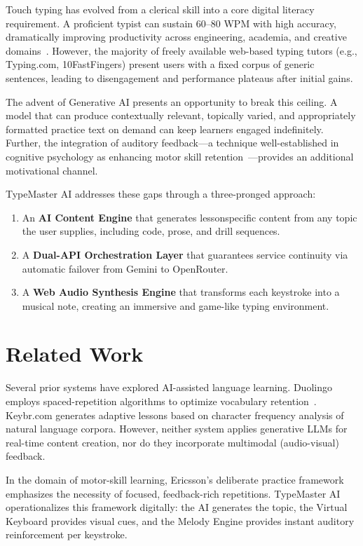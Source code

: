 \documentclass[conference]{IEEEtran}
\begin{document}
Touch typing has evolved from a clerical skill into a core digital
literacy requirement. A proficient typist can sustain 60--80 WPM
with high accuracy, dramatically improving productivity across
engineering, academia, and creative domains~\cite{brown2012}.
However, the majority of freely available web-based typing tutors
(e.g., Typing.com, 10FastFingers) present users with a fixed corpus
of generic sentences, leading to disengagement and performance
plateaus after initial gains.

The advent of Generative AI presents an opportunity to break this
ceiling. A model that can produce contextually relevant, topically
varied, and appropriately formatted practice text on demand can keep
learners engaged indefinitely. Further, the integration of auditory
feedback---a technique well-established in cognitive psychology as
enhancing motor skill retention~\cite{mayer2014}---provides an
additional motivational channel.

TypeMaster AI addresses these gaps through a three-pronged approach:
\begin{enumerate}
  \item An \textbf{AI Content Engine} that generates lessonspecific
        content from any topic the user supplies, including code,
        prose, and drill sequences.
  \item A \textbf{Dual-API Orchestration Layer} that guarantees
        service continuity via automatic failover from Gemini to OpenRouter.
  \item A \textbf{Web Audio Synthesis Engine} that transforms each
        keystroke into a musical note, creating an immersive and
        game-like typing environment.
\end{enumerate}

\section{Related Work}

Several prior systems have explored AI-assisted language learning.
Duolingo employs spaced-repetition algorithms to optimize vocabulary
retention~\cite{mayer2014}. Keybr.com generates adaptive lessons
based on character frequency analysis of natural language corpora.
However, neither system applies generative LLMs for real-time content
creation, nor do they incorporate multimodal (audio-visual) feedback.

In the domain of motor-skill learning, Ericsson's deliberate practice
framework~\cite{brown2012} emphasizes the necessity of focused,
feedback-rich repetitions. TypeMaster AI operationalizes this
framework digitally: the AI generates the topic, the Virtual Keyboard
provides visual cues, and the Melody Engine provides instant auditory
reinforcement per keystroke.
\end{document}

